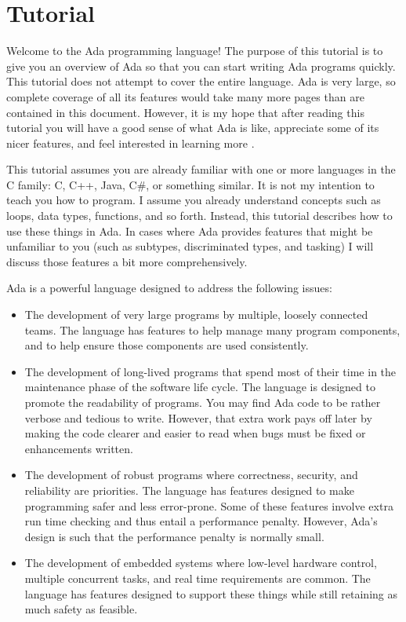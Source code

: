 
\chapter{Tutorial}
\label{chapt:tutorial}

Welcome to the Ada programming language! The purpose of this tutorial is to give you an overview
of Ada so that you can start writing Ada programs quickly. This tutorial does not attempt to
cover the entire language. Ada is very large, so complete coverage of all its features would
take many more pages than are contained in this document. However, it is my hope that after
reading this tutorial you will have a good sense of what Ada is like, appreciate some of its
nicer features, and feel interested in learning more
\cite{Barnes2014,McCormick2011,Ben-Ari2009,Burns2007,Dale2007}.

This tutorial assumes you are already familiar with one or more languages in the C family: C,
C++, Java, C\#, or something similar. It is not my intention to teach you how to program. I
assume you already understand concepts such as loops, data types, functions, and so forth.
Instead, this tutorial describes how to use these things in Ada. In cases where Ada provides
features that might be unfamiliar to you (such as subtypes, discriminated types, and tasking) I
will discuss those features a bit more comprehensively.

Ada is a powerful language designed to address the following issues:

\begin{itemize}
\item The development of very large programs by multiple, loosely connected teams. The language
  has features to help manage many program components, and to help ensure those components are
  used consistently.

\item The development of long-lived programs that spend most of their time in the maintenance
  phase of the software life cycle. The language is designed to promote the readability of
  programs. You may find Ada code to be rather verbose and tedious to write. However, that extra
  work pays off later by making the code clearer and easier to read when bugs must be fixed or
  enhancements written.

\item The development of robust programs where correctness, security, and reliability are
  priorities. The language has features designed to make programming safer and less error-prone.
  Some of these features involve extra run time checking and thus entail a performance penalty.
  However, Ada's design is such that the performance penalty is normally small.

\item The development of embedded systems where low-level hardware control, multiple concurrent
  tasks, and real time requirements are common. The language has features designed to support
  these things while still retaining as much safety as feasible.
\end{itemize}


